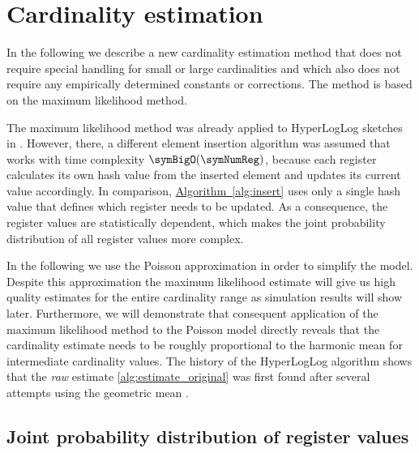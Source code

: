 \documentclass[11pt]{article} %
\newcommand*{\algoref}[1]{\hyperref[#1]{Algorithm~\ref*{#1}}}
\begin{document}
\section{Cardinality estimation}
\label{sec:cardinality_estimation}
In the following we describe a new cardinality estimation method that does not require special handling for small or large cardinalities and which also does not require any empirically determined constants or corrections. The method is based on the maximum likelihood method. 

The maximum likelihood method was already applied to HyperLogLog sketches in \cite{Clifford2012}. However, there, a different element insertion algorithm was assumed that works with time complexity $\symBigO(\symNumReg)$, because each register calculates its own hash value from the inserted element and updates its current value accordingly. In comparison, \algoref{alg:insert} uses only a single hash value that defines which register needs to be updated. As a consequence, the register values are statistically dependent, which makes the joint probability distribution of all register values more complex.

In the following we use the Poisson approximation in order to simplify the model. Despite this approximation the maximum likelihood estimate will give us high quality estimates for the entire cardinality range as simulation results will show later. Furthermore, we will demonstrate that consequent application of the maximum likelihood method to the Poisson model directly reveals that the cardinality estimate needs to be roughly proportional to the harmonic mean for intermediate cardinality values. The history of the HyperLogLog algorithm shows that the \emph{raw} estimate \eqref{alg:estimate_original} was first found after several attempts using the geometric mean \cite{Flajolet2007, Durand2003}.

\subsection{Joint probability distribution of register values}
\end{document}
